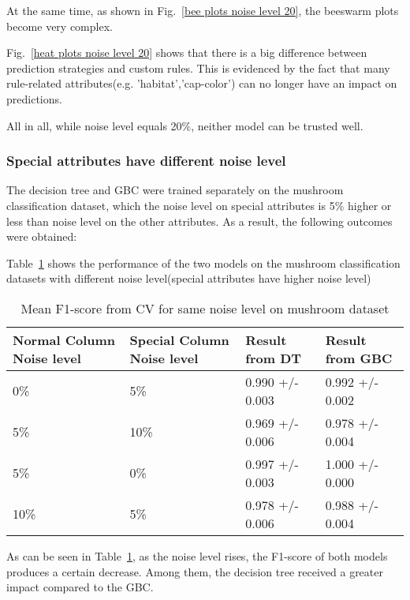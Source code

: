 \documentclass[runningheads,a4paper]{llncs}
\begin{document}
At the same time, as shown in Fig.~\ref{bee plots noise level 20}, the beeswarm plots become very complex.

Fig.~\ref{heat plots noise level 20} shows that there is a big difference between prediction strategies and custom rules.
This is evidenced by the fact that many rule-related attributes(e.g. 'habitat','cap-color') can no longer have an impact on predictions.

All in all, while noise level equals 20\%, neither model can be trusted well.

\subsubsection{Special attributes have different noise level}
The decision tree and GBC were trained separately on the mushroom classification dataset, which the noise level on special attributes is 5\% higher or less than noise level on the other attributes. As a result, the following outcomes were obtained:

Table~\ref{result from spcial different mushroom} shows the performance of the two models on the mushroom classification datasets with different noise level(special attributes have higher noise level)

\begin{table}[H]
	\centering
	\caption{Mean F1-score from CV for same noise level on mushroom dataset}
	\label{result from spcial different mushroom}
	\begin{tabular}{|l|l|l|l|}
		\hline
		Normal Column Noise level&Special Column Noise level & Result from DT  &Result from GBC\\
		\hline
		0\%& 5\%& 0.990 +/- 0.003 & 0.992 +/- 0.002 \\
		5\%& 10\%& 0.969 +/- 0.006 & 0.978 +/- 0.004 \\
		\hline
		5\%& 0\%& 0.997 +/- 0.003 & 1.000 +/- 0.000 \\
		10\%& 5\%& 0.978 +/- 0.006 & 0.988 +/- 0.004 \\
		\hline
	\end{tabular}
\end{table}

As can be seen in Table~\ref{result from spcial different mushroom}, as the noise level rises, the F1-score of both models produces a certain decrease. Among them, the decision tree received a greater impact compared to the GBC. 
\end{document}
